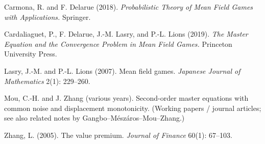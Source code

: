 \documentclass[11pt,letterpaper,oneside]{article}
\numberwithin{equation}{section}
\newcommand{\1}{\mathbf{1}}
\begin{document}
\begin{thebibliography}{99}\small

 Carmona, R. and F. Delarue (2018).
\emph{Probabilistic Theory of Mean Field Games with Applications.}
Springer.

 Cardaliaguet, P., F. Delarue, J.-M. Lasry, and P.-L. Lions (2019).
\emph{The Master Equation and the Convergence Problem in Mean Field Games.}
Princeton University Press.

 Lasry, J.-M. and P.-L. Lions (2007).
Mean field games.
\emph{Japanese Journal of Mathematics} 2(1): 229--260.

 Mou, C.-H. and J. Zhang (various years).
Second-order master equations with common noise and displacement monotonicity.
(Working papers / journal articles; see also related notes by Gangbo--Mészáros--Mou--Zhang.)

 Zhang, L. (2005).
The value premium.
\emph{Journal of Finance} 60(1): 67--103.

\end{thebibliography}
\end{document}
